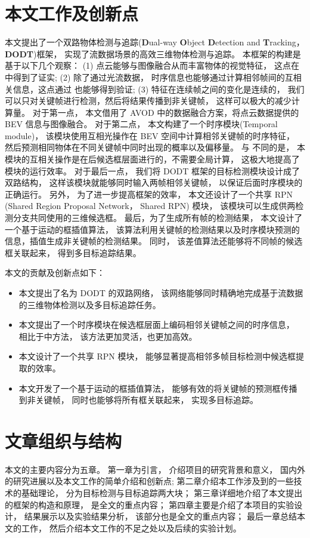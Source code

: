 \section{本文工作及创新点}
\label{subsec:contribution}
本文提出了一个双路物体检测与追踪(\textbf{D}ual-way \textbf{O}bject \textbf{D}etection and \textbf{T}racking， \textbf{DODT})框架， 实现了流数据场景的高效三维物体检测与追踪。 本框架的构建是基于以下几个观察： (1) 点云能够与图像融合从而丰富物体的视觉特征， 这点在 \cite{chen2017multi,ku2018joint}中得到了证实; (2) 除了通过光流数据， 时序信息也能够通过计算相邻帧间的互相关信息，这点通过 \cite{feichtenhofer2017detect} 也能够得到验证; (3) 特征在连续帧之间的变化是连续的， 我们可以只对关键帧进行检测，然后将结果传播到非关键帧， 这样可以极大的减少计算量。 对于第一点， 本文借用了 AVOD\cite{ku2018joint} 中的数据融合方案，将点云数据提供的 BEV 信息与图像融合。 对于第二点， 本文构建了一个时序模块(Temporal module)， 该模块使用互相光操作在 BEV 空间中计算相邻关键帧的时序特征， 然后预测相同物体在不同关键帧中同时出现的概率以及偏移量。 与 \cite{feichtenhofer2017detect,dosovitskiy2015flownet} 不同的是， 本模块的互相关操作是在后候选框层面进行的，不需要全局计算， 这极大地提高了模块的运行效率。 对于最后一点， 我们将 DODT 框架的目标检测模块设计成了双路结构， 这样该模块就能够同时输入两帧相邻关键帧， 以保证后面时序模块的正确运行。 另外， 为了进一步提高框架的效率， 本文还设计了一个共享 RPN (Shared Region Proposal Network， Shared RPN) 模块， 该模块可以生成供两检测分支共同使用的三维候选框。 最后，为了生成所有帧的检测结果， 本文设计了一个基于运动的框插值算法， 该算法利用关键帧的检测结果以及时序模块预测的信息，插值生成非关键帧的检测结果。 同时， 该差值算法还能够将不同帧的候选框关联起来， 得到多目标追踪结果。

本文的贡献及创新点如下：
\begin{itemize}
	\item 本文提出了名为 DODT 的双路网络， 该网络能够同时精确地完成基于流数据的三维物体检测以及多目标追踪任务。
	\item 本文提出了一个时序模块在候选框层面上编码相邻关键帧之间的时序信息， 相比于\cite{feichtenhofer2017detect,dosovitskiy2015flownet}中方法， 该方法更加灵活，也更加高效。
	\item 本文设计了一个共享 RPN 模块， 能够显著提高相邻多帧目标检测中候选框提取的效率。
	\item 本文开发了一个基于运动的框插值算法， 能够有效的将关键帧的预测框传播到非关键帧， 同时也能够将所有框关联起来， 实现多目标追踪。
\end{itemize}


\section{文章组织与结构}
\label{subsec:structure}
本文的主要内容分为五章。 第一章为引言， 介绍项目的研究背景和意义， 国内外的研究进展以及本文工作的简单介绍和创新点; 第二章介绍本工作涉及到的一些技术的基础理论， 分为目标检测与目标追踪两大块； 第三章详细地介绍了本文提出的框架的构造和原理， 是全文的重点内容； 第四章主要是介绍了本项目的实验设计， 结果展示以及实验结果分析， 该部分也是全文的重点内容； 最后一章总结本文的工作， 然后介绍本文工作的不足之处以及后续的实验计划。 


\ifprint
	\newpage
	\thispagestyle{empty}
	\mbox{}
	
	\clearpage
	\setcounter{page}{10}
\fi
